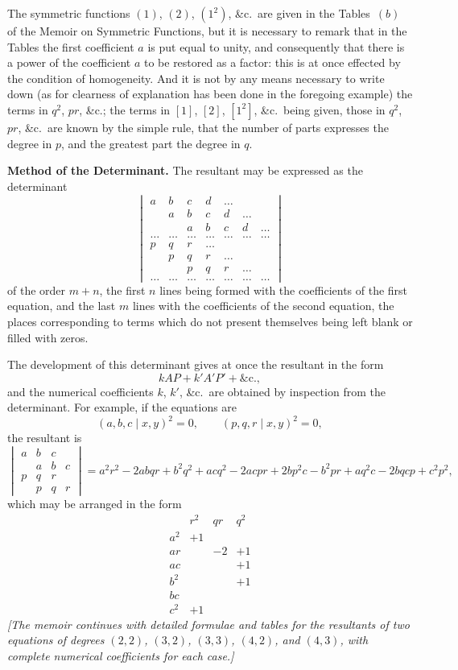 \documentclass[11pt,a4paper]{book}
\begin{document}
\begin{center}
The symmetric functions $(1)$, $(2)$, $(1^2)$, \&c.\ are given in the Tables~$(b)$
of the Memoir on Symmetric Functions, but it is necessary to remark that in
the Tables the first coefficient $a$ is put equal to unity, and consequently
that there is a power of the coefficient $a$ to be restored as a factor: this
is at once effected by the condition of homogeneity. And it is not by any
means necessary to write down (as for clearness of explanation has been done
in the foregoing example) the terms in $q^2$, $pr$, \&c.; the terms in $[1]$,
$[2]$, $[1^2]$, \&c.\ being given, those in $q^2$, $pr$, \&c.\ are known by
the simple rule, that the number of parts expresses the degree in $p$, and the
greatest part the degree in $q$.

\newpage
\textbf{Method of the Determinant.} The resultant may be expressed as the
determinant
\[
\begin{vmatrix}
a & b & c & d & \ldots \\
  & a & b & c & d & \ldots \\
  &   & a & b & c & d & \ldots \\
\ldots & \ldots & \ldots & \ldots & \ldots & \ldots & \ldots \\[-0.5em]
p & q & r & \ldots \\
  & p & q & r & \ldots \\
  &   & p & q & r & \ldots \\
\ldots & \ldots & \ldots & \ldots & \ldots & \ldots & \ldots
\end{vmatrix}
\]
of the order $m + n$, the first $n$ lines being formed with the coefficients
of the first equation, and the last $m$ lines with the coefficients of the
second equation, the places corresponding to terms which do not present
themselves being left blank or filled with zeros.

The development of this determinant gives at once the resultant in the form
\[
kAP + k'A'P' + \&\text{c.},
\]
and the numerical coefficients $k$, $k'$, \&c.\ are obtained by inspection from
the determinant. For example, if the equations are
\[
(a, b, c \mid x, y)^2 = 0, \qquad (p, q, r \mid x, y)^2 = 0,
\]
the resultant is
\[
\begin{vmatrix}
a & b & c \\
  & a & b & c \\
p & q & r \\
  & p & q & r
\end{vmatrix}
= a^2 r^2 - 2abqr + b^2 q^2 + acq^2 - 2acpr + 2bp^2 c - b^2 pr + aq^2 c
- 2bqcp + c^2 p^2,
\]
which may be arranged in the form
\[
\begin{array}{c|ccc}
& r^2 & qr & q^2 \\
\hline
a^2 & +1 \\
ar & & -2 & +1 \\
ac & & & +1 \\
b^2 & & & +1 \\
bc & & \\
c^2 & +1
\end{array}
\]
\textit{[The memoir continues with detailed formulae and tables for the
resultants of two equations of degrees $(2,2)$, $(3,2)$, $(3,3)$, $(4,2)$,
and $(4,3)$, with complete numerical coefficients for each case.]}


\end{center}
\end{document}
